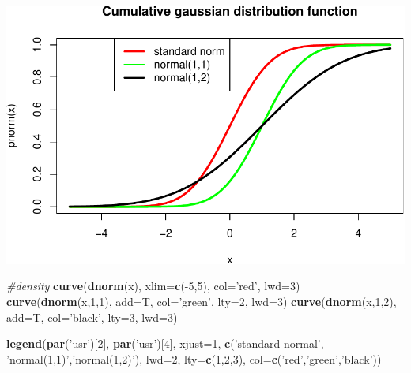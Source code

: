 \documentclass[]{article}
\newenvironment{Shaded}{\begin{snugshade}}{\end{snugshade}}
\newcommand{\KeywordTok}[1]{\textcolor[rgb]{0.13,0.29,0.53}{\textbf{{#1}}}}
\newcommand{\DataTypeTok}[1]{\textcolor[rgb]{0.13,0.29,0.53}{{#1}}}
\newcommand{\DecValTok}[1]{\textcolor[rgb]{0.00,0.00,0.81}{{#1}}}
\newcommand{\StringTok}[1]{\textcolor[rgb]{0.31,0.60,0.02}{{#1}}}
\newcommand{\CommentTok}[1]{\textcolor[rgb]{0.56,0.35,0.01}{\textit{{#1}}}}
\newcommand{\NormalTok}[1]{{#1}}
\begin{document}
\includegraphics{probability_files/figure-latex/unnamed-chunk-18-1.pdf}

\begin{Shaded}
\begin{Highlighting}[]
\CommentTok{#density}
\KeywordTok{curve}\NormalTok{(}\KeywordTok{dnorm}\NormalTok{(x), }\DataTypeTok{xlim=}\KeywordTok{c}\NormalTok{(-}\DecValTok{5}\NormalTok{,}\DecValTok{5}\NormalTok{), }\DataTypeTok{col=}\StringTok{'red'}\NormalTok{, }\DataTypeTok{lwd=}\DecValTok{3}\NormalTok{)}
\KeywordTok{curve}\NormalTok{(}\KeywordTok{dnorm}\NormalTok{(x,}\DecValTok{1}\NormalTok{,}\DecValTok{1}\NormalTok{), }\DataTypeTok{add=}\NormalTok{T, }\DataTypeTok{col=}\StringTok{'green'}\NormalTok{, }\DataTypeTok{lty=}\DecValTok{2}\NormalTok{, }\DataTypeTok{lwd=}\DecValTok{3}\NormalTok{)}
\KeywordTok{curve}\NormalTok{(}\KeywordTok{dnorm}\NormalTok{(x,}\DecValTok{1}\NormalTok{,}\DecValTok{2}\NormalTok{), }\DataTypeTok{add=}\NormalTok{T, }\DataTypeTok{col=}\StringTok{'black'}\NormalTok{, }\DataTypeTok{lty=}\DecValTok{3}\NormalTok{, }\DataTypeTok{lwd=}\DecValTok{3}\NormalTok{)}

\KeywordTok{legend}\NormalTok{(}\KeywordTok{par}\NormalTok{(}\StringTok{'usr'}\NormalTok{)[}\DecValTok{2}\NormalTok{], }\KeywordTok{par}\NormalTok{(}\StringTok{'usr'}\NormalTok{)[}\DecValTok{4}\NormalTok{], }\DataTypeTok{xjust=}\DecValTok{1}\NormalTok{,}
       \KeywordTok{c}\NormalTok{(}\StringTok{'standard normal'}\NormalTok{, }\StringTok{'normal(1,1)'}\NormalTok{,}\StringTok{'normal(1,2)'}\NormalTok{),}
       \DataTypeTok{lwd=}\DecValTok{2}\NormalTok{, }\DataTypeTok{lty=}\KeywordTok{c}\NormalTok{(}\DecValTok{1}\NormalTok{,}\DecValTok{2}\NormalTok{,}\DecValTok{3}\NormalTok{),}
       \DataTypeTok{col=}\KeywordTok{c}\NormalTok{(}\StringTok{'red'}\NormalTok{,}\StringTok{'green'}\NormalTok{,}\StringTok{'black'}\NormalTok{))}
\end{Highlighting}
\end{Shaded}
\end{document}
